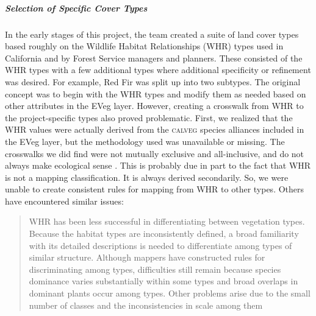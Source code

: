 \subparagraph{Selection of Specific Cover Types}
In the early stages of this project, the team created a suite of land cover types based roughly on the Wildlife Habitat Relationships (WHR) types used in California and by Forest Service managers and planners. These consisted of the WHR types with a few additional types where additional specificity or refinement was desired. For example, Red Fir was split up into two subtypes. The original concept was to begin with the WHR types and modify them as needed based on other attributes in the EVeg layer. However, creating a crosswalk from WHR to the project-specific types also proved problematic. First, we realized that the WHR values were actually derived from the \textsc{calveg} species alliances included in the EVeg layer, but the methodology used was unavailable or missing. The crosswalks we did find were not mutually exclusive and all-inclusive, and do not always make ecological sense \citep{Keeler-Wolf2007,DeBecker1988,Game2005}. This is probably due in part to the fact that WHR is not a mapping classification. It is always derived secondarily. So, we were unable to create consistent rules for mapping from WHR to other types. Others have encountered similar issues:
%
\begin{quote}
WHR has been less successful in differentiating between vegetation types. Because the habitat types are inconsistently defined, a broad familiarity with its detailed descriptions is needed to differentiate among types of similar structure. Although mappers have constructed rules for discriminating among types, difficulties still remain because species dominance varies substantially within some types and broad overlaps in dominant plants occur among types. Other problems arise due to the small number of classes and the inconsistencies in scale among them \citep[p.~23]{Keeler-Wolf2007}
\end{quote}
%
